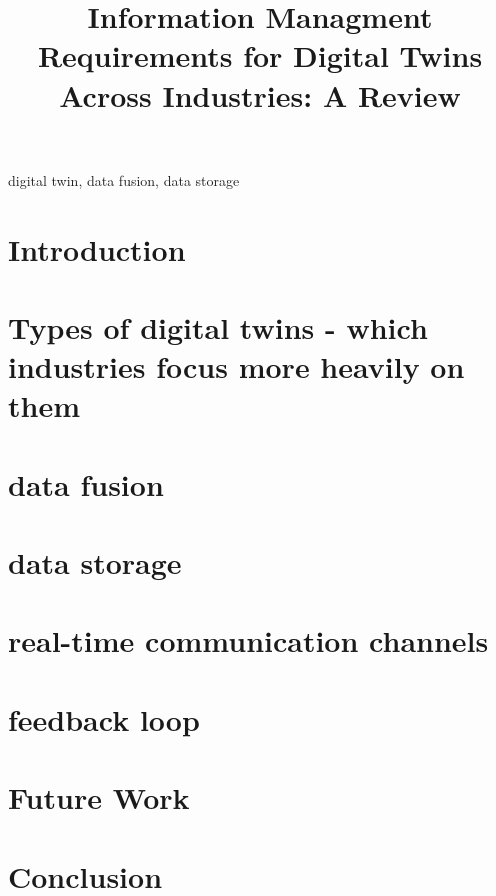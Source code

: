 \documentclass[conference]{IEEEtran}
\begin{document}
\title{Information Managment Requirements for Digital Twins Across Industries: A Review}
\author{
}

\maketitle

\begin{abstract}

\end{abstract}

\begin{IEEEkeywords}
    digital twin, data fusion, data storage
\end{IEEEkeywords}

\section{Introduction}

\section{Types of digital twins - which industries focus more heavily on them} 

\section{data fusion}

\section{data storage}

\section{real-time communication channels}

\section{feedback loop}

\section{Future Work}

\section{Conclusion}

\cite{boyes_digital_2022}



\end{document}
